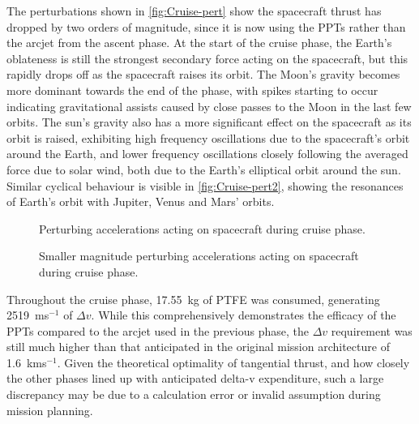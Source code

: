 The perturbations shown in \autoref{fig:Cruise-pert} show the spacecraft thrust has dropped by two orders of magnitude, since it is now using the PPTs rather than the arcjet from the ascent phase. At the start of the cruise phase, the Earth's oblateness is still the strongest secondary force acting on the spacecraft, but this rapidly drops off as the spacecraft raises its orbit. The Moon's gravity becomes more dominant towards the end of the phase, with spikes starting to occur indicating gravitational assists caused by close passes to the Moon in the last few orbits. The sun's gravity also has a more significant effect on the spacecraft as its orbit is raised, exhibiting high frequency oscillations due to the spacecraft's orbit around the Earth, and lower frequency oscillations closely following the averaged force due to solar wind, both due to the Earth's elliptical orbit around the sun. Similar cyclical behaviour is visible in \autoref{fig:Cruise-pert2}, showing the resonances of Earth's orbit with Jupiter, Venus and Mars' orbits.

\begin{subfigures}
\begin{figure}
\centering
\def\svgwidth{\figurewidth}

\caption{Perturbing accelerations acting on spacecraft during cruise phase.} \label{fig:Cruise-pert}
\end{figure}

\begin{figure}
\centering
\def\svgwidth{\figurewidth}

\caption{Smaller magnitude perturbing accelerations acting on spacecraft during cruise phase.} \label{fig:Cruise-pert2}
\end{figure}
\end{subfigures}

Throughout the cruise phase, 17.55~kg of PTFE was consumed, generating 2519~ms$^{-1}$ of $\Delta v$. While this comprehensively demonstrates the efficacy of the PPTs compared to the arcjet used in the previous phase, the $\Delta v$ requirement was still much higher than that anticipated in the original mission architecture of 1.6~kms$^{-1}$. Given the theoretical optimality of tangential thrust, and how closely the other phases lined up with anticipated delta-v expenditure, such a large discrepancy may be due to a calculation error or invalid assumption during mission planning.


